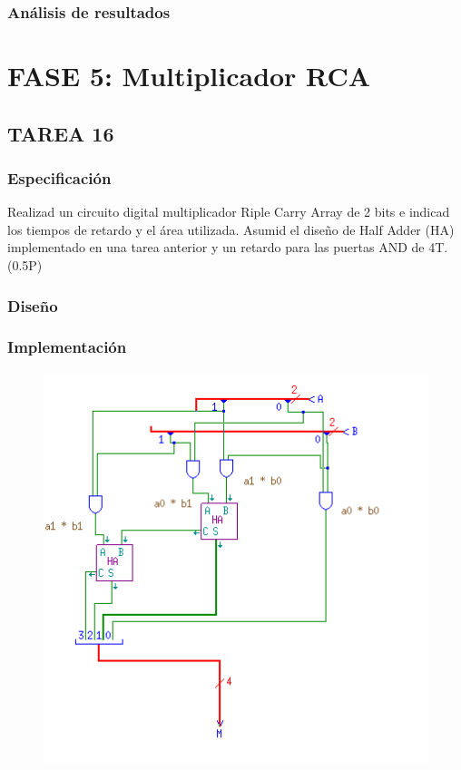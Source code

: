 \documentclass{article}
\begin{document}
		\subsubsection*{Análisis de resultados}


\section{FASE 5: Multiplicador RCA}

	\subsection{TAREA 16}
		\subsubsection*{Especificación}
		Realizad un circuito digital multiplicador Riple Carry Array de 2 bits e indicad los
		tiempos de retardo y el área utilizada. Asumid el diseño de Half Adder (HA) implementado en una
		tarea anterior y un retardo para las puertas AND de 4T. (0.5P)

		\subsubsection*{Diseño}

		\subsubsection*{Implementación}
		 \begin{figure}[ht]
		 	\includegraphics[width=0.8\linewidth]{RCA2}
		 	\centering
		 \end{figure}
\end{document}

